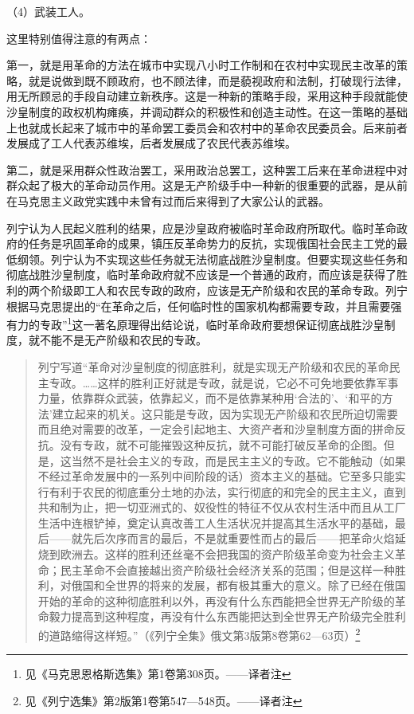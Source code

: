 （4）武装工人。

这里特别值得注意的有两点：

第一，就是用革命的方法在城市中实现八小时工作制和在农村中实现民主改革的策略，就是说做到既不顾政府，也不顾法律，而是藐视政府和法制，打破现行法律，用无所顾忌的手段自动建立新秩序。这是一种新的策略手段，采用这种手段就能使沙皇制度的政权机构瘫痪，并调动群众的积极性和创造主动性。在这一策略的基础上也就成长起来了城市中的革命罢工委员会和农村中的革命农民委员会。后来前者发展成了工人代表苏维埃，后者发展成了农民代表苏维埃。

第二，就是采用群众性政治罢工，采用政治总罢工，这种罢工后来在革命进程中对群众起了极大的革命动员作用。这是无产阶级手中一种新的很重要的武器，是从前在马克思主义政党实践中未曾有过而后来得到了大家公认的武器。

列宁认为人民起义胜利的结果，应是沙皇政府被临时革命政府所取代。临时革命政府的任务是巩固革命的成果，镇压反革命势力的反抗，实现俄国社会民主工党的最低纲领。列宁认为不实现这些任务就无法彻底战胜沙皇制度。但要实现这些任务和彻底战胜沙皇制度，临时革命政府就不应该是一个普通的政府，而应该是获得了胜利的两个阶级即工人和农民专政的政府，应该是无产阶级和农民的革命专政。列宁根据马克思提出的“在革命之后，任何临时性的国家机构都需要专政，并且需要强有力的专政”\footnote{见《马克思恩格斯选集》第1卷第308页。——译者注}这一著名原理得出结论说，临时革命政府要想保证彻底战胜沙皇制度，就不能不是无产阶级和农民的专政。

\begin{quotation}
列宁写道“革命对沙皇制度的彻底胜利，就是实现无产阶级和农民的革命民主专政。……这样的胜利正好就是专政，就是说，它必不可免地要依靠军事力量，依靠群众武装，依靠起义，而不是依靠某种用‘合法的’、‘和平的方法’建立起来的机关。这只能是专政，因为实现无产阶级和农民所迫切需要而且绝对需要的改革，一定会引起地主、大资产者和沙皇制度方面的拼命反抗。没有专政，就不可能摧毁这种反抗，就不可能打破反革命的企图。但是，这当然不是社会主义的专政，而是民主主义的专政。它不能触动（如果不经过革命发展中的一系列中间阶段的话）资本主义的基础。它至多只能实行有利于农民的彻底重分土地的办法，实行彻底的和完全的民主主义，直到共和制为止，把一切亚洲式的、奴役性的特征不仅从农村生活中而且从工厂生活中连根铲掉，奠定认真改善工人生活状况并提高其生活水平的基础，最后——就先后次序而言的最后，不是就重要性而占的最后——把革命火焰延烧到欧洲去。这样的胜利还丝毫不会把我国的资产阶级革命变为社会主义革命；民主革命不会直接越出资产阶级社会经济关系的范围；但是这样一种胜利，对俄国和全世界的将来的发展，都有极其重大的意义。除了已经在俄国开始的革命的这种彻底胜利以外，再没有什么东西能把全世界无产阶级的革命毅力提高到这种程度，再没有什么东西能把达到全世界无产阶级完全胜利的道路缩得这样短。”（《列宁全集》俄文第3版第8卷第62—63页）\footnote{见《列宁选集》第2版第1卷第547—548页。——译者注}
\end{quotation}

